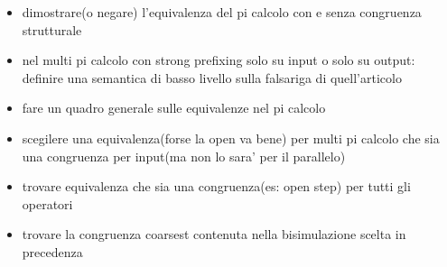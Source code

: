 




\begin{itemize}
  \item
    dimostrare(o negare) l'equivalenza del pi calcolo con e senza congruenza strutturale
  \item
    nel multi pi calcolo con strong prefixing solo su input o solo su output: definire una semantica di basso livello sulla falsariga di quell'articolo
  \item
    fare un quadro generale sulle equivalenze nel pi calcolo
  \item
    scegilere una equivalenza(forse la open va bene) per multi pi calcolo che sia una congruenza per input(ma non lo sara' per il parallelo)
  \item
    trovare equivalenza che sia una congruenza(es: open step) per tutti gli operatori
  \item
    trovare la congruenza coarsest contenuta nella bisimulazione scelta in precedenza
\end{itemize}



